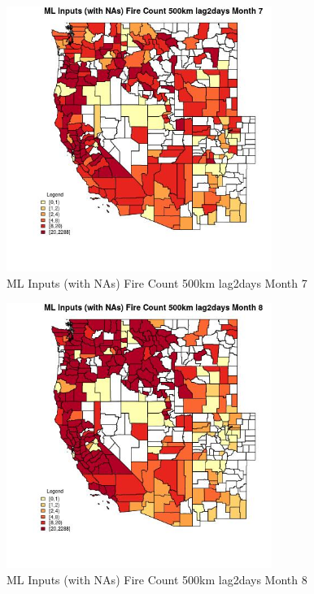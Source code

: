 \begin{figure} 
\centering  
\includegraphics[width=0.77\textwidth]{Code_Outputs/Report_ML_input_PM25_Step4_part_e_de_duplicated_aves_compiled_2019-05-20wNAs_CountyFire_Count_500km_lag2daysmedianMonth7.jpg} 
\caption{\label{fig:Report_ML_input_PM25_Step4_part_e_de_duplicated_aves_compiled_2019-05-20wNAsCountyFire_Count_500km_lag2daysmedianMonth7}ML Inputs (with NAs) Fire Count 500km lag2days Month 7} 
\end{figure} 
 

\begin{figure} 
\centering  
\includegraphics[width=0.77\textwidth]{Code_Outputs/Report_ML_input_PM25_Step4_part_e_de_duplicated_aves_compiled_2019-05-20wNAs_CountyFire_Count_500km_lag2daysmedianMonth8.jpg} 
\caption{\label{fig:Report_ML_input_PM25_Step4_part_e_de_duplicated_aves_compiled_2019-05-20wNAsCountyFire_Count_500km_lag2daysmedianMonth8}ML Inputs (with NAs) Fire Count 500km lag2days Month 8} 
\end{figure} 
 

